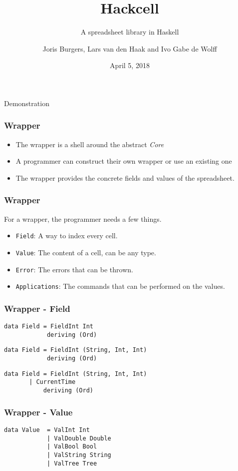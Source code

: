 \documentclass{beamer}
\title{Hackcell}
\subtitle{A spreadsheet library in Haskell}
\author{Joris Burgers, Lars van den Haak and Ivo Gabe de Wolff}
\date{April 5, 2018}
\begin{document}
	\frame{\titlepage}
  \begin{frame}
	\begin{center}
		\huge{Demonstration}
	\end{center}
  \end{frame}
  \begin{frame}
  		\frametitle{Wrapper}
		\begin{itemize}  		
  			\item The wrapper is a shell around the abstract \textit{Core}
  			\item A programmer can construct their own wrapper or use an existing one
  			\item The wrapper provides the concrete fields and values of the spreadsheet.
  		\end{itemize}
  \end{frame}
  \begin{frame}
  		\frametitle{Wrapper}
  		For a wrapper, the programmer needs a few things.
  		\begin{itemize}
  			\item \texttt{Field}: A way to index every cell.
  			\item \texttt{Value}: The content of a cell, can be any type.
  			\item \texttt{Error}: The errors that can be thrown.
  			\item \texttt{Applications}: The commands that can be performed on the values.
  		\end{itemize}
  \end{frame}
  \begin{frame}[fragile]
  		\frametitle{Wrapper - Field}
  		\begin{verbatim}
data Field = FieldInt Int
            deriving (Ord)
  		\end{verbatim}
  		\pause
		\begin{verbatim}
data Field = FieldInt (String, Int, Int)
            deriving (Ord)
  		\end{verbatim}  		
  		\pause
  		\begin{verbatim}
data Field = FieldInt (String, Int, Int)
	   | CurrentTime
           deriving (Ord)
        \end{verbatim} 
  \end{frame}
\begin{frame}[fragile]
  		\frametitle{Wrapper - Value}
  		\begin{verbatim}
data Value  = ValInt Int
            | ValDouble Double
            | ValBool Bool
            | ValString String
            | ValTree Tree
  		\end{verbatim}
  \end{frame}
\end{document}
